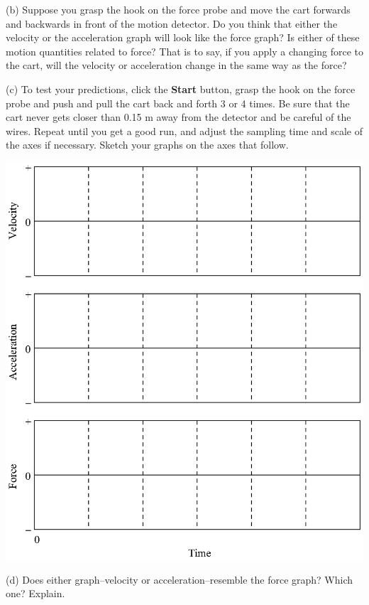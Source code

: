 (b) Suppose you grasp the hook on the force probe and move the cart forwards
and backwards in front of the motion detector. Do you think that either the
velocity or the acceleration graph will look like the force graph? Is either
of these motion quantities related to force? That is to say, if you apply a
changing force to the cart, will the velocity or acceleration change in the
same way as the force?
\answerspace{35mm}

\pagebreak[3]
(c) To test your predictions, click the \textbf{Start} button, grasp the
hook on the force probe and push and pull the cart back and forth 3 or 4 times. Be sure that
the cart never gets closer than 0.15 m away from the detector and be careful
of the wires. Repeat until you get a good run, and adjust the sampling time
and scale of the axes if necessary. Sketch your graphs on the axes that follow.

\vspace{0.3cm}
{\par\centering \includegraphics{force1/force1_fig2.eps} \par}
\vspace{0.3cm}

(d) Does either graph--velocity or acceleration--resemble the force graph? Which
one? Explain.
\answerspace{20mm}

